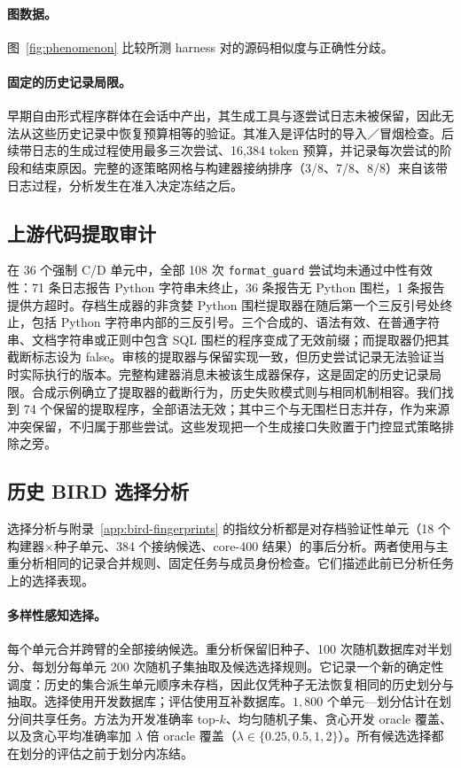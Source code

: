 \paragraph{图数据。}图~\ref{fig:phenomenon} 比较所测 harness 对的源码相似度与正确性分歧。

\paragraph{固定的历史记录局限。}早期自由形式程序群体在会话中产出，其生成工具与逐尝试日志未被保留，因此无法从这些历史记录中恢复预算相等的验证。其准入是评估时的导入／冒烟检查。后续带日志的生成过程使用最多三次尝试、16{,}384 token 预算，并记录每次尝试的阶段和结束原因。完整的逐策略网格与构建器接纳排序（3/8、7/8、8/8）来自该带日志过程，分析发生在准入决定冻结之后。

\subsection{上游代码提取审计}\label{app:extraction}
在 36 个强制 C/D 单元中，全部 108 次 \texttt{format\_guard} 尝试均未通过中性有效性：71 条日志报告 Python 字符串未终止，36 条报告无 Python 围栏，1 条报告提供方超时。存档生成器的非贪婪 Python 围栏提取器在随后第一个三反引号处终止，包括 Python 字符串内部的三反引号。三个合成的、语法有效、在普通字符串、文档字符串或正则中包含 SQL 围栏的程序变成了无效前缀；而提取器仍把其截断标志设为 false。审核的提取器与保留实现一致，但历史尝试记录无法验证当时实际执行的版本。完整构建器消息未被该生成器保存，这是固定的历史记录局限。合成示例确立了提取器的截断行为，历史失败模式则与相同机制相容。我们找到 74 个保留的提取程序，全部语法无效；其中三个与无围栏日志并存，作为来源冲突保留，不归属于那些尝试。这些发现把一个生成接口失败置于门控显式策略排除之旁。



\subsection{历史 BIRD 选择分析}\label{app:rich}
选择分析与附录~\ref{app:bird-fingerprints} 的指纹分析都是对存档验证性单元（18 个构建器$\times$种子单元、384 个接纳候选、core-400 结果）的事后分析。两者使用与主重分析相同的记录合并规则、固定任务与成员身份检查。它们描述此前已分析任务上的选择表现。

\paragraph{多样性感知选择。}每个单元合并跨臂的全部接纳候选。重分析保留旧种子、100 次随机数据库对半划分、每划分每单元 200 次随机子集抽取及候选选择规则。它记录一个新的确定性调度：历史的集合派生单元顺序未存档，因此仅凭种子无法恢复相同的历史划分与抽取。选择使用开发数据库；评估使用互补数据库。$1{,}800$ 个单元—划分估计在划分间共享任务。方法为开发准确率 top-$k$、均匀随机子集、贪心开发 oracle 覆盖、以及贪心平均准确率加 $\lambda$ 倍 oracle 覆盖（$\lambda\in\{0.25,0.5,1,2\}$）。所有候选选择都在划分的评估之前于划分内冻结。

